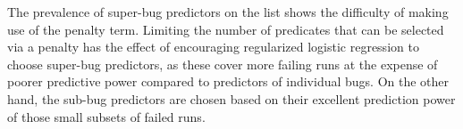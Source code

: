 The prevalence of super-bug predictors on the list shows the
difficulty of making use of the penalty term.  Limiting the number of
predicates that can be selected via a penalty has the effect of
encouraging regularized logistic regression to choose super-bug predictors, as
these cover more failing runs at the expense of poorer predictive
power compared to predictors of individual bugs.  On the other hand,
the sub-bug predictors are chosen based on their excellent prediction
power of those small subsets of failed runs.

